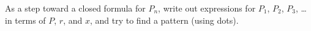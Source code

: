 \documentclass[handout,space,nooutcomes]{ximera}
\begin{document}
\begin{question}
As a step toward a closed formula for $P_n$, write out expressions for $P_1$, $P_2$, $P_3$, \dots in terms of $P$, $r$, and $x$, and try to find a pattern (using dots).  
\end{question}



%
\end{document}
